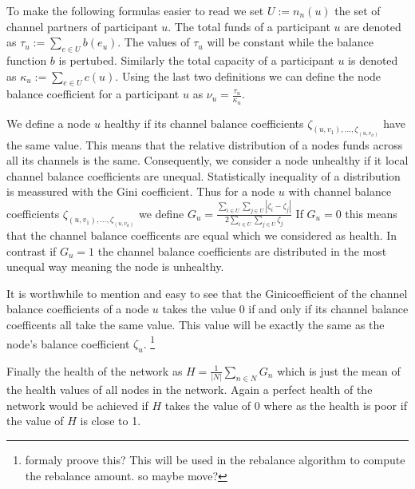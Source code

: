 \documentclass[a4paper]{paper}
\begin{document}
To make the following formulas easier to read we set $U:=n_n(u)$ the set of channel partners of participant $u$.
The total funds of a participant $u$ are denoted as $\tau_u:=\displaystyle{\sum_{e\in U}b(e_u)}$.
The values of $\tau_u$ will be constant while the balance function $b$ is pertubed.
Similarly the total capacity of a participant $u$ is denoted as $\kappa_u:=\displaystyle{\sum_{e\in U}c(u)}$.
Using the last two definitions we can define the node balance coefficient for a participant $u$ as $\nu_u = \frac{\tau_u}{\kappa_u}$.

We define a node $u$ healthy if its channel balance coefficients $\zeta_{(u,v_1),\dots,\zeta_{(u,v_d)}}$ have the same value.
This means that the relative distribution of a nodes funds across all its channels is the same.
Consequently, we consider a node unhealthy if it local channel balance coefficients are unequal.
Statistically inequality of a distribution is meassured with the Gini coefficient.
Thus for a node $u$ with channel balance coefficients $\zeta_{(u,v_1),\dots,\zeta_{(u,v_d)}}$ we define $G_u = \frac{\displaystyle{\sum_{i\in U} \sum_{j \in U}} | \zeta_i - \zeta_j |}{2 \displaystyle{\sum_{i \in U} \sum_{j \in U} \zeta_j}}$
If $G_u = 0$ this means that the channel balance coefficents are equal which we considered as health.
In contrast if $G_u = 1$ the channel balance coefficients are distributed in the most unequal way meaning the node is unhealthy.

It is worthwhile to mention and easy to see that the Ginicoefficient of the channel balance coefficients of a node $u$ takes the value $0$ if and only if its channel balance coefficents all take the same value.
This value will be exactly the same as the node's balance coefficient $\zeta_u$. \footnote{formaly proove this? This will be used in the rebalance algorithm to compute the rebalance amount. so maybe move? }

Finally the health of the network as $H = \displaystyle{\frac{1}{|N|}\sum_{n\in N}G_n}$ which is just the mean of the health values of all nodes in the network.
Again a perfect health of the network would be achieved if $H$ takes the value of $0$ where as the health is poor if the value of $H$ is close to 1.
\end{document}
